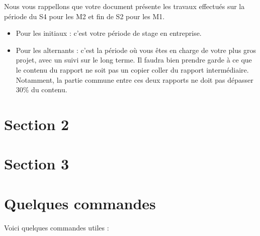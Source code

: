 \documentclass{rapportCS}
\begin{document}
Nous vous rappellons que votre document présente les travaux effectués sur la période du S4 pour les M2 et fin de S2 pour les M1.
\begin{itemize}
    \item Pour les initiaux : c'est votre période de stage en entreprise.
    \item Pour les alternants : c'est la période où vous êtes en charge de votre plus gros projet, avec un suivi sur le long terme. Il faudra bien prendre garde à ce que le contenu du rapport ne soit pas un copier coller du rapport intermédiaire. Notamment, la partie commune entre ces deux rapports ne doit pas dépasser 30\% du contenu.
\end{itemize}



\newpage
\section{Section 2}

\lipsum[1-2]

\section{Section 3}
\lipsum[3-4]
\newpage






\section{Quelques commandes}

Voici quelques commandes utiles :
\end{document}
